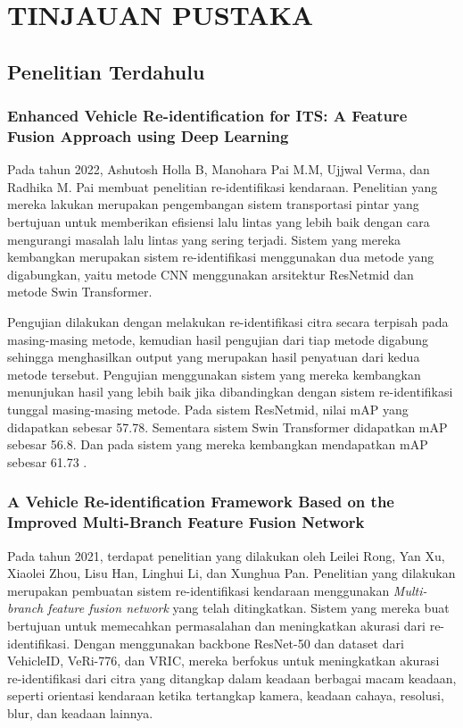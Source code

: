 \chapter{TINJAUAN PUSTAKA}
\label{chap:tinjauanpustaka}

\section{Penelitian Terdahulu}
\label{sec:penelitianterdahulu}

\subsection{Enhanced Vehicle Re-identification for ITS: A Feature Fusion Approach using Deep Learning}

Pada tahun 2022, Ashutosh Holla B, Manohara Pai M.M, Ujjwal Verma, dan Radhika M. Pai membuat penelitian 
re-identifikasi kendaraan. Penelitian yang mereka lakukan merupakan pengembangan sistem transportasi pintar 
yang bertujuan untuk memberikan efisiensi lalu lintas yang lebih baik dengan cara mengurangi masalah lalu 
lintas yang sering terjadi. Sistem yang mereka kembangkan merupakan sistem re-identifikasi menggunakan dua 
metode yang digabungkan, yaitu metode CNN menggunakan arsitektur ResNetmid dan metode Swin Transformer.

Pengujian dilakukan dengan melakukan re-identifikasi citra secara terpisah pada masing-masing metode, 
kemudian hasil pengujian dari tiap metode digabung sehingga menghasilkan output yang merupakan hasil 
penyatuan dari kedua metode tersebut. Pengujian menggunakan sistem yang mereka kembangkan menunjukan hasil 
yang lebih baik jika dibandingkan dengan sistem re-identifikasi tunggal masing-masing metode. Pada sistem 
ResNetmid, nilai mAP yang didapatkan sebesar 57.78. Sementara sistem Swin Transformer didapatkan mAP sebesar 
56.8. Dan pada sistem yang mereka kembangkan mendapatkan mAP sebesar 61.73 \parencite{Holla2022}.

\subsection{A Vehicle Re-identification Framework Based on the Improved Multi-Branch Feature Fusion Network}

Pada tahun 2021, terdapat penelitian yang dilakukan oleh Leilei Rong, Yan Xu, Xiaolei Zhou, Lisu Han, Linghui 
Li, dan Xunghua Pan. Penelitian yang dilakukan merupakan pembuatan sistem re-identifikasi kendaraan menggunakan 
\emph{Multi-branch feature fusion network} yang telah ditingkatkan. Sistem yang mereka buat bertujuan untuk memecahkan 
permasalahan dan meningkatkan akurasi dari re-identifikasi. Dengan menggunakan backbone ResNet-50 dan dataset 
dari VehicleID, VeRi-776, dan VRIC, mereka berfokus untuk meningkatkan akurasi re-identifikasi dari citra yang 
ditangkap dalam keadaan berbagai macam keadaan, seperti orientasi kendaraan ketika tertangkap kamera, keadaan 
cahaya, resolusi, blur, dan keadaan lainnya.

